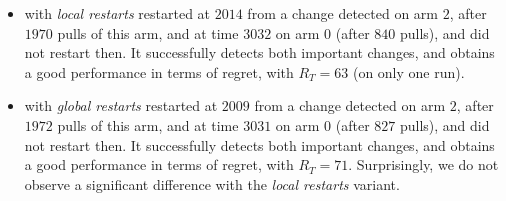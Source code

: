 \begin{itemize}
    \item
    \GLRklUCB{} with \emph{local restarts} restarted at $2014$ from a change detected on arm $2$, after $1970$ pulls of this arm, and at time $3032$ on arm $0$ (after $840$ pulls), and did not restart then. It successfully detects both important changes, and obtains a good performance in terms of regret, with $R_T = 63$ (on only one run).

    \item
    \GLRklUCB{} with \emph{global restarts} restarted at $2009$ from a change detected on arm $2$, after $1972$ pulls of this arm, and at time $3031$ on arm $0$ (after $827$ pulls), and did not restart then. It successfully detects both important changes, and obtains a good performance in terms of regret, with $R_T = 71$.
    Surprisingly, we do not observe a significant difference with the \emph{local restarts} variant.


\end{itemize}
